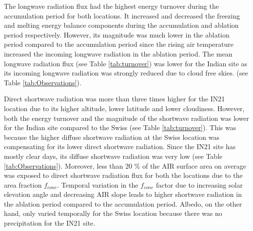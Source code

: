 \documentclass[utf8]{frontiersSCNS}
\begin{document}
The longwave radiation flux had the highest energy turnover during the accumulation period for both
locations. It increased and decreased the freezing and melting energy balance components during the accumulation
and ablation period respectively. However, its magnitude was much lower in the ablation period compared to the
accumulation period since the rising air temperature increased the incoming longwave radiation in the ablation
period. The mean longwave radiation flux (see Table \ref{tab:turnover}) was lower for the Indian site as its incoming longwave
radiation was strongly reduced due to cloud free skies. (see Table \ref{tab:Observations}).

Direct shortwave radiation was more than three times higher for the IN21 location due to its higher altitude, 
lower latitude and lower cloudiness. However, both the energy turnover and the magnitude of the shortwave radiation was lower for
the Indian site compared to the Swiss (see Table \ref{tab:turnover}). This was because the higher diffuse
shortwave radiation at the Swiss location was compensating for its lower direct shortwave radiation. Since the
IN21 site has mostly clear days, its diffuse shortwave radiation was very low (see Table
\ref{tab:Observations}). Moreover, less than 20 \% of the AIR surface area on average was exposed to direct
shortwave radiation flux for both the locations due to the area fraction $f_{cone}$. Temporal variation in the
$f_{cone}$ factor due to increasing solar elevation angle and decreasing AIR slope leads to higher shortwave
radiation in the ablation period compared to the accumulation period. Albedo, on the other hand, only varied
temporally for the Swiss location because there was no precipitation for the IN21 site.
\end{document}
